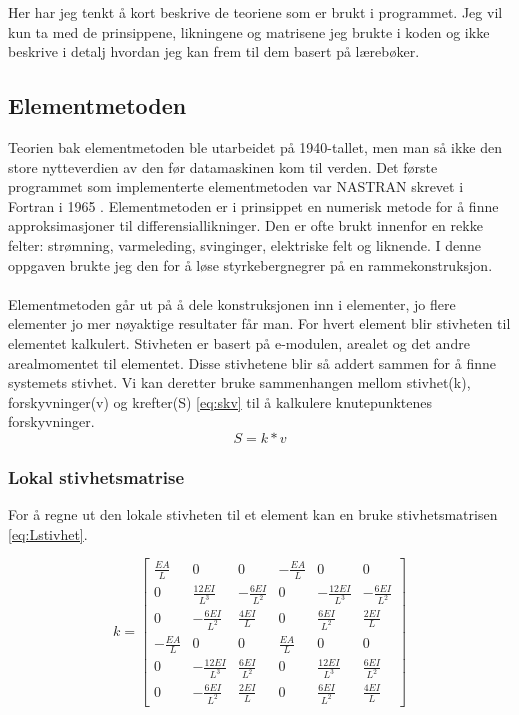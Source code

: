 \documentclass[10pt,a4paper, norsk]{article}
\begin{document}
Her har jeg tenkt å kort beskrive de teoriene som er brukt i programmet. Jeg vil kun ta med de prinsippene, likningene og matrisene jeg brukte i koden og ikke beskrive i detalj hvordan jeg kan frem til dem basert på lærebøker. 


\subsection*{Elementmetoden}
Teorien bak elementmetoden ble utarbeidet på 1940-tallet, men man så ikke den store nytteverdien av den før datamaskinen kom til verden. Det første programmet som implementerte elementmetoden var NASTRAN skrevet i Fortran i 1965 \cite{wikinastran}.
Elementmetoden er i prinsippet en numerisk metode for å finne approksimasjoner til differensiallikninger. Den er ofte brukt innenfor en rekke felter: strømning, varmeleding, svinginger, elektriske felt og liknende. I denne oppgaven brukte jeg den for å løse styrkebergnegrer på en rammekonstruksjon. 

\paragraph*{}
Elementmetoden går ut på å dele konstruksjonen inn i elementer, jo flere elementer jo mer nøyaktige resultater får man. For hvert element blir stivheten til elementet kalkulert. Stivheten er basert på e-modulen, arealet og det andre arealmomentet til elementet. Disse stivhetene blir så addert sammen for å finne systemets stivhet. Vi kan deretter bruke sammenhangen mellom stivhet(k), forskyvninger(v) og krefter(S) \eqref{eq:skv} til å kalkulere knutepunktenes forskyvninger.
\begin{equation} \label{eq:skv}
S=k*v
\end{equation}

\subsubsection*{Lokal stivhetsmatrise}
For å regne ut den lokale stivheten til et element kan en bruke stivhetsmatrisen \eqref{eq:Lstivhet}. 

\begin{equation} \label{eq:Lstivhet}
k  = \begin{bmatrix} 
\frac{EA}{L} & 0 & 0 & -\frac{EA}{L} & 0 & 0 \\
0 	& \frac{12EI}{L^3} & -\frac{6EI}{L^2} & 0 & -\frac{12EI}{L^3} & -\frac{6EI}{L^2} \\
0 	&	-\frac{6EI}{L^2} 	& 	\frac{4EI}{L} & 0 & \frac{6EI}{L^2} 	& 	\frac{2EI}{L}\\
-\frac{EA}{L} & 0 & 0 & \frac{EA}{L} & 0 & 0 \\
0 	& -\frac{12EI}{L^3} & \frac{6EI}{L^2} & 0 & \frac{12EI}{L^3} & \frac{6EI}{L^2} \\
0 & -\frac{6EI}{L^2} & \frac{2EI}{L} &0& \frac{6EI}{L^2} & \frac{4EI}{L}
\end{bmatrix}
\end{equation}
\end{document}
